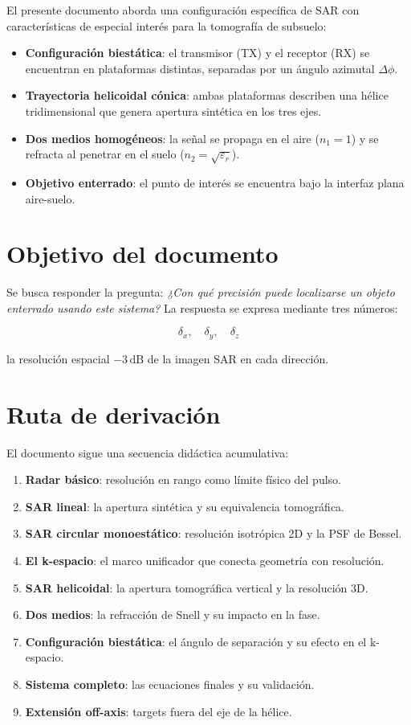 \documentclass[12pt,a4paper,oneside]{book}
\begin{document}
El presente documento aborda una configuración específica de SAR con características de especial interés para la tomografía de subsuelo:
\begin{itemize}
  \item \textbf{Configuración biestática}: el transmisor (TX) y el receptor (RX) se encuentran en plataformas distintas, separadas por un ángulo azimutal $\Delta\phi$.
  \item \textbf{Trayectoria helicoidal cónica}: ambas plataformas describen una hélice tridimensional que genera apertura sintética en los tres ejes.
  \item \textbf{Dos medios homogéneos}: la señal se propaga en el aire ($n_1=1$) y se refracta al penetrar en el suelo ($n_2=\sqrt{\varepsilon_r}$).
  \item \textbf{Objetivo enterrado}: el punto de interés se encuentra bajo la interfaz plana aire-suelo.
\end{itemize}

\section{Objetivo del documento}

Se busca responder la pregunta: \emph{¿Con qué precisión puede localizarse un objeto enterrado usando este sistema?} La respuesta se expresa mediante tres números:

\[
\delta_x,\quad \delta_y,\quad \delta_z
\]

la resolución espacial $-3\,\text{dB}$ de la imagen SAR en cada dirección.

\section{Ruta de derivación}

El documento sigue una secuencia didáctica acumulativa:

\begin{enumerate}
  \item \textbf{Radar básico}: resolución en rango como límite físico del pulso.
  \item \textbf{SAR lineal}: la apertura sintética y su equivalencia tomográfica.
  \item \textbf{SAR circular monoestático}: resolución isotrópica 2D y la PSF de Bessel.
  \item \textbf{El k-espacio}: el marco unificador que conecta geometría con resolución.
  \item \textbf{SAR helicoidal}: la apertura tomográfica vertical y la resolución 3D.
  \item \textbf{Dos medios}: la refracción de Snell y su impacto en la fase.
  \item \textbf{Configuración biestática}: el ángulo de separación y su efecto en el k-espacio.
  \item \textbf{Sistema completo}: las ecuaciones finales y su validación.
  \item \textbf{Extensión off-axis}: targets fuera del eje de la hélice.
\end{enumerate}
\end{document}

